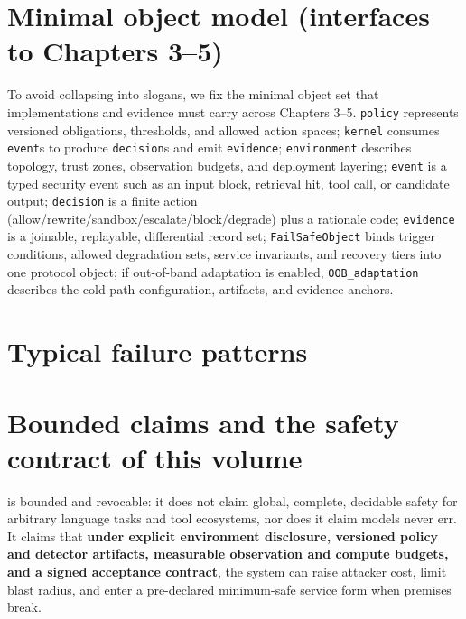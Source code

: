 \documentclass[11pt,a4paper]{report}
\begin{document}
\section{Minimal object model (interfaces to Chapters 3--5)}
To avoid \DecoupledSafety{} collapsing into slogans, we fix the minimal object set that implementations and evidence must carry across Chapters 3--5. \texttt{policy} represents versioned obligations, thresholds, and allowed action spaces; \texttt{kernel} consumes \texttt{event}s to produce \texttt{decision}s and emit \texttt{evidence}; \texttt{environment} describes topology, trust zones, observation budgets, and deployment layering; \texttt{event} is a typed security event such as an input block, retrieval hit, tool call, or candidate output; \texttt{decision} is a finite action (allow/rewrite/sandbox/escalate/block/degrade) plus a rationale code; \texttt{evidence} is a joinable, replayable, differential record set; \texttt{FailSafeObject} binds trigger conditions, allowed degradation sets, service invariants, and recovery tiers into one protocol object; if out-of-band adaptation is enabled, \texttt{OOB\_adaptation} describes the cold-path configuration, artifacts, and evidence anchors.

\section{Typical failure patterns}

\section{Bounded claims and the safety contract of this volume}
\DecoupledSafety{} is bounded and revocable: it does not claim global, complete, decidable safety for arbitrary language tasks and tool ecosystems, nor does it claim models never err. It claims that \textbf{under explicit environment disclosure, versioned policy and detector artifacts, measurable observation and compute budgets, and a signed acceptance contract}, the system can raise attacker cost, limit blast radius, and enter a pre-declared minimum-safe service form when premises break.
\end{document}
